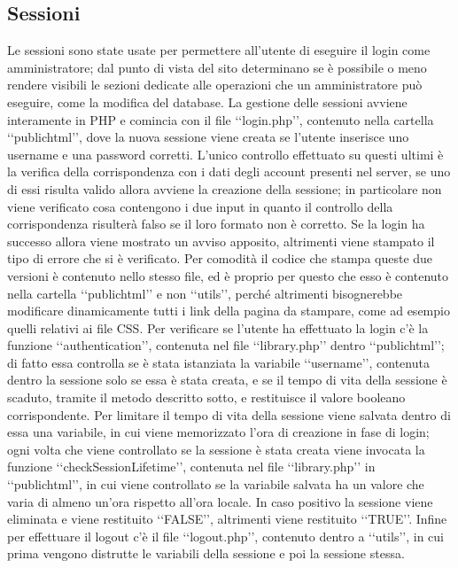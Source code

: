 {	\subsection{Sessioni}{
		Le sessioni sono state usate per permettere all'utente di eseguire il login come amministratore; dal punto di vista del sito determinano se è possibile o meno rendere visibili le sezioni dedicate alle operazioni che un amministratore può eseguire, come la modifica del database. La gestione delle sessioni avviene interamente in PHP e comincia con il file ‘‘login.php’’, contenuto nella cartella ‘‘public\textunderscore html’’, dove la nuova sessione viene creata se l'utente inserisce uno username e una password corretti. L'unico controllo effettuato su questi ultimi è la verifica della corrispondenza con i dati degli account presenti nel server, se uno di essi risulta valido allora avviene la creazione della sessione; in particolare non viene verificato cosa contengono i due input in quanto il controllo della corrispondenza risulterà falso se il loro formato non è corretto. Se la login ha successo allora viene mostrato un avviso apposito, altrimenti viene stampato il tipo di errore che si è verificato. Per comodità il codice che stampa queste due versioni è contenuto nello stesso file, ed è proprio per questo che esso è contenuto nella cartella ‘‘public\textunderscore html’’ e non ‘‘utils’’, perché altrimenti bisognerebbe modificare dinamicamente tutti i link della pagina da stampare, come ad esempio quelli relativi ai file CSS.
		Per verificare se l'utente ha effettuato la login c'è la funzione ‘‘authentication’’, contenuta nel file ‘‘library.php’’ dentro ‘‘public\textunderscore html’’; di fatto essa controlla se è stata istanziata la variabile ‘‘username’’, contenuta dentro la sessione solo se essa è stata creata, e se il tempo di vita della sessione è scaduto, tramite il metodo descritto sotto, e restituisce il valore booleano corrispondente.
		Per limitare il tempo di vita della sessione viene salvata dentro di essa una variabile, in cui viene memorizzato l'ora di creazione in fase di login; ogni volta che viene controllato se la sessione è stata creata viene invocata la funzione ‘‘checkSessionLifetime’’, contenuta nel file ‘‘library.php’’ in ‘‘public\textunderscore html’’, in cui viene controllato se la variabile salvata ha un valore che varia di almeno un'ora rispetto all'ora locale. In caso positivo la sessione viene eliminata e viene restituito ‘‘FALSE’’, altrimenti viene restituito ‘‘TRUE’’.
		Infine per effettuare il logout c'è il file ‘‘logout.php’’, contenuto dentro a ‘‘utils’’, in cui prima vengono distrutte le variabili della sessione e poi la sessione stessa.
	}
}